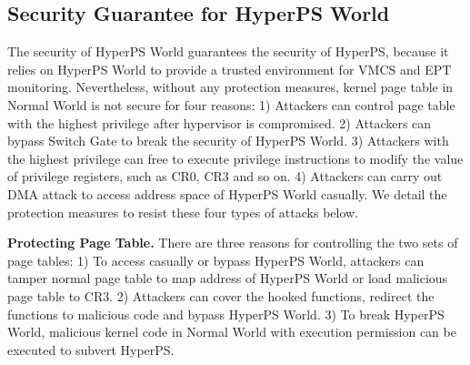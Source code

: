 \documentclass[conference]{IEEEtran}
\begin{document}
\subsection{Security Guarantee for HyperPS World}\label {SG}
The security of HyperPS World guarantees the security of HyperPS, because it relies on HyperPS World to provide a trusted environment for VMCS and EPT monitoring.
Nevertheless, without any protection measures, kernel page table in Normal World is not secure for four reasons: 1) Attackers can control page table with the highest privilege after hypervisor is compromised. 2) Attackers can bypass Switch Gate to break the security of HyperPS World. 3) Attackers with the highest privilege can free to execute privilege instructions to modify the value of privilege registers, such as CR0, CR3 and so on. 4) Attackers can carry out DMA attack to access address space of HyperPS World casually.
We detail the protection measures to resist these four types of attacks below.



\textbf{Protecting Page Table.}
There are three reasons for controlling the two sets of page tables: 1) To access casually or bypass HyperPS World, attackers can tamper normal page table to map address of HyperPS World or load malicious page table to CR3.
2) Attackers can cover the hooked functions, redirect the functions to malicious code and bypass HyperPS World.
 3) To break HyperPS World, malicious kernel code in Normal World with execution permission can be executed to subvert HyperPS.
\end{document}
